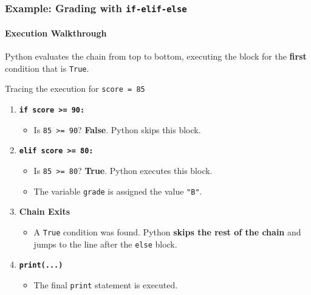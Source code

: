 \documentclass{beamer}
\begin{document}
\begin{frame}[fragile]
    \frametitle{Example: Grading with \texttt{if-elif-else}}
    \framesubtitle{Execution Walkthrough}
    
    Python evaluates the chain from top to bottom, executing the block for the \textbf{first} condition that is \texttt{True}.
    
    \vspace{1em}
    
    \begin{block}{Tracing the execution for \texttt{score = 85}}
    \begin{enumerate}
        \item \textbf{\texttt{if score >= 90:}}
        \begin{itemize}
            \item Is \texttt{85 >= 90}? \textbf{False}. Python skips this block.
        \end{itemize}
        
        \item \textbf{\texttt{elif score >= 80:}}
        \begin{itemize}
            \item Is \texttt{85 >= 80}? \textbf{True}. Python executes this block.
            \item The variable \texttt{grade} is assigned the value \texttt{"B"}.
        \end{itemize}
        
        \item \textbf{Chain Exits}
        \begin{itemize}
            \item A \texttt{True} condition was found. Python \textbf{skips the rest of the chain} and jumps to the line after the \texttt{else} block.
        \end{itemize}
        
        \item \textbf{\texttt{print(...)}}
        \begin{itemize}
            \item The final \texttt{print} statement is executed.
        \end{itemize}
    \end{enumerate}
    \end{block}
    
\end{frame}
\end{document}
